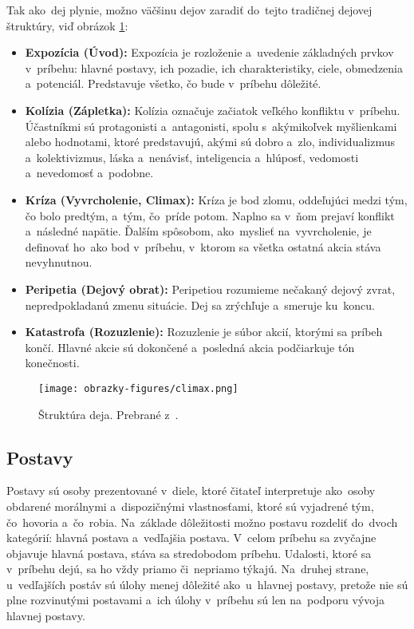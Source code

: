 Tak ako~dej plynie, možno väčšinu dejov zaradiť do~tejto tradičnej dejovej štruktúry, viď obrázok \ref{climax}:
\begin{itemize}
	\item \textbf{Expozícia (Úvod):} Expozícia je rozloženie a~uvedenie základných prvkov v~príbehu: hlavné postavy, ich pozadie, ich charakteristiky, ciele, obmedzenia a~potenciál. Predstavuje všetko, čo bude v~príbehu dôležité.
    \item \textbf{Kolízia (Zápletka):} Kolízia označuje začiatok veľkého konfliktu v~príbehu. Účastníkmi sú protagonisti a~antagonisti, spolu s~akýmikoľvek myšlienkami alebo hodnotami, ktoré predstavujú, akými sú dobro a~zlo, individualizmus a~kolektivizmus, láska a~nenávisť, inteligencia a~hlúposť, vedomosti a~nevedomosť a~podobne.
    \item \textbf{Kríza (Vyvrcholenie, Climax):} Kríza je bod zlomu, oddeľujúci medzi tým, čo bolo predtým, a~tým, čo~príde potom. Naplno sa v~ňom prejaví konflikt a~následné napätie. Ďalším spôsobom, ako~myslieť na~vyvrcholenie, je definovať ho~ako bod v~príbehu, v~ktorom sa všetka ostatná akcia stáva nevyhnutnou.
    \item \textbf{Peripetia (Dejový obrat):} Peripetiou rozumieme nečakaný dejový zvrat, nepredpokladanú zmenu situácie. Dej sa zrýchľuje a~smeruje ku~koncu.
    \item \textbf{Katastrofa (Rozuzlenie):} Rozuzlenie je súbor akcií, ktorými sa príbeh končí. Hlavné akcie sú dokončené a~posledná akcia podčiarkuje tón konečnosti.
\end{itemize}
\begin{figure}[hbt]
	\centering
	\texttt{[image: obrazky-figures/climax.png]}
	\caption{Štruktúra deja. Prebrané z~\cite{ClimaxImage}.}
	\label{climax}
\end{figure}

\subsection*{Postavy}
Postavy sú osoby prezentované v~diele, ktoré čitateľ interpretuje ako~osoby obdarené morálnymi a~dispozičnými vlastnosťami, ktoré sú vyjadrené tým, čo~hovoria a~čo~robia.
Na~základe dôležitosti možno postavu rozdeliť do~dvoch kategórií: hlavná postava a~vedľajšia postava. V~celom príbehu sa zvyčajne objavuje hlavná postava, stáva sa stredobodom príbehu. Udalosti, ktoré sa v~príbehu dejú, sa ho vždy priamo či~nepriamo týkajú. Na~druhej strane, u~vedľajších postáv sú úlohy menej dôležité ako~u~hlavnej postavy, pretože nie sú plne rozvinutými postavami a~ich úlohy v~príbehu sú len na~podporu vývoja hlavnej postavy.

